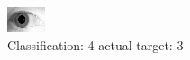 \begin{figure}[h!]
\begin{center}
\includegraphics[width=0.60\columnwidth]{figures/ID1808_class_4_target_3.png}
\end{center}
\caption{ Classification: 4 actual target: 3}
\label{fig:ID1808_class_4_target_3}
\end{figure}
